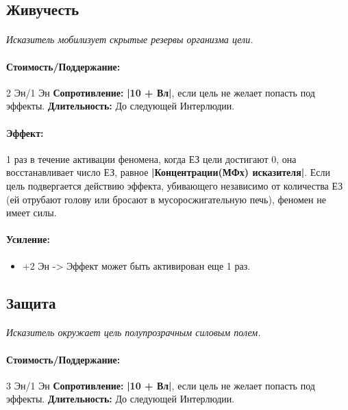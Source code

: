 \subsection{Живучесть}
\paragraph{} 
\textit{Исказитель мобилизует скрытые резервы организма цели.}
\paragraph{Стоимость/Поддержание: }2 Эн/1 Эн
\newline
\textbf{Сопротивление: }
\textbf{|10 + Вл|}, если цель не желает попасть под эффекты.
\newline 
\textbf{Длительность: }До следующей Интерлюдии.
\paragraph{Эффект: }1 раз в течение активации феномена, когда ЕЗ цели достигают 0, она восстанавливает число ЕЗ, равное 
\textbf{|Концентрации(МФх) исказителя|}. Если цель подвергается действию эффекта, убивающего независимо от количества ЕЗ (ей отрубают голову или бросают в мусоросжигательную печь), феномен не имеет силы.
\paragraph{Усиление:}
\begin{itemize}
\item+2 Эн -> Эффект может быть активирован еще 1 раз.
\end{itemize}
\subsection{Защита}
\paragraph{} 
\textit{Исказитель окружает цель полупрозрачным силовым полем.}
\paragraph{Стоимость/Поддержание: }3 Эн/1 Эн
\newline
\textbf{Сопротивление: }
\textbf{|10 + Вл|}, если цель не желает попасть под эффекты.
\newline 
\textbf{Длительность: }До следующей Интерлюдии.
